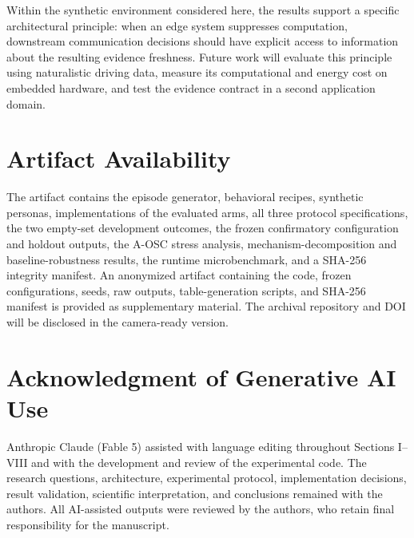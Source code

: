 \documentclass[conference]{IEEEtran}
\begin{document}
Within the synthetic environment considered here, the results support a
specific architectural principle: when an edge system suppresses
computation, downstream communication decisions should have explicit
access to information about the resulting evidence freshness. Future
work will evaluate this principle using naturalistic driving data,
measure its computational and energy cost on embedded hardware, and test
the evidence contract in a second application domain.

\section*{Artifact Availability}

The artifact contains the episode generator, behavioral recipes,
synthetic personas, implementations of the evaluated arms, all three
protocol specifications, the two empty-set development outcomes, the
frozen confirmatory configuration and holdout outputs, the A-OSC stress
analysis, mechanism-decomposition and baseline-robustness results, the
runtime microbenchmark, and a SHA-256 integrity manifest. An anonymized
artifact containing the code, frozen configurations, seeds, raw
outputs, table-generation scripts, and SHA-256 manifest is provided as
supplementary material. The archival repository and DOI will be
disclosed in the camera-ready version.

\section*{Acknowledgment of Generative AI Use}

Anthropic Claude (Fable 5) assisted with language editing throughout
Sections I--VIII and with the development and review of the
experimental code. The research questions, architecture, experimental protocol, implementation decisions, result validation, scientific interpretation, and conclusions remained with the authors. All AI-assisted outputs were reviewed by the authors, who retain final responsibility for the manuscript.
\end{document}
